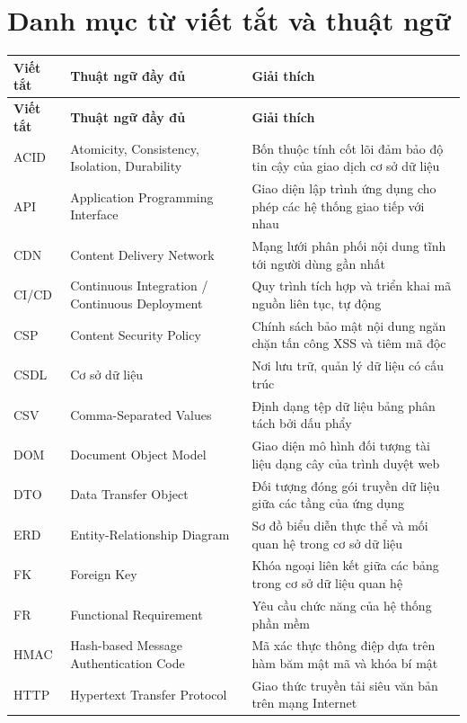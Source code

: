 \chapter*{Danh mục từ viết tắt và thuật ngữ}

\begin{longtable}{|p{2.8cm}|p{5.5cm}|p{6.7cm}|}
\hline
\textbf{Viết tắt} & \textbf{Thuật ngữ đầy đủ} & \textbf{Giải thích} \\
\hline
\endfirsthead
\hline
\textbf{Viết tắt} & \textbf{Thuật ngữ đầy đủ} & \textbf{Giải thích} \\
\hline
\endhead
ACID & Atomicity, Consistency, Isolation, Durability & Bốn thuộc tính cốt lõi đảm bảo độ tin cậy của giao dịch cơ sở dữ liệu \\ \hline
API & Application Programming Interface & Giao diện lập trình ứng dụng cho phép các hệ thống giao tiếp với nhau \\ \hline
CDN & Content Delivery Network & Mạng lưới phân phối nội dung tĩnh tới người dùng gần nhất \\ \hline
CI/CD & Continuous Integration / Continuous Deployment & Quy trình tích hợp và triển khai mã nguồn liên tục, tự động \\ \hline
CSP & Content Security Policy & Chính sách bảo mật nội dung ngăn chặn tấn công XSS và tiêm mã độc \\ \hline
CSDL & Cơ sở dữ liệu & Nơi lưu trữ, quản lý dữ liệu có cấu trúc \\ \hline
CSV & Comma-Separated Values & Định dạng tệp dữ liệu bảng phân tách bởi dấu phẩy \\ \hline
DOM & Document Object Model & Giao diện mô hình đối tượng tài liệu dạng cây của trình duyệt web \\ \hline
DTO & Data Transfer Object & Đối tượng đóng gói truyền dữ liệu giữa các tầng của ứng dụng \\ \hline
ERD & Entity-Relationship Diagram & Sơ đồ biểu diễn thực thể và mối quan hệ trong cơ sở dữ liệu \\ \hline
FK & Foreign Key & Khóa ngoại liên kết giữa các bảng trong cơ sở dữ liệu quan hệ \\ \hline
FR & Functional Requirement & Yêu cầu chức năng của hệ thống phần mềm \\ \hline
HMAC & Hash-based Message Authentication Code & Mã xác thực thông điệp dựa trên hàm băm mật mã và khóa bí mật \\ \hline
HTTP & Hypertext Transfer Protocol & Giao thức truyền tải siêu văn bản trên mạng Internet \\ \hline

\end{longtable}
